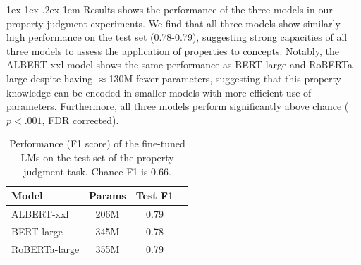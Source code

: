 \documentclass[10pt,letterpaper]{article}
\makeatletter
\newcommand{\km}[1]{\textcolor{purple}{$_{KM}$[#1]}}
\newcommand{\todo}[1]{\textcolor{purple}{$_{todo}$[#1]}}
\newcommand{\true}{\mathsf{True}}
\newcommand{\false}{\mathsf{False}}
\renewcommand{\paragraph}{%
  \@startsection{paragraph}{4}%
  {\z@}{1ex \@plus 1ex \@minus .2ex}{-1em}%
  {\normalfont\normalsize\bfseries}%
}
\makeatother
\begin{document}
\paragraph{Results}
 shows the performance of the three models in our property judgment experiments. 
We find that all three models show similarly high performance on the test set (0.78-0.79), suggesting strong capacities of all three models to assess the application of properties to concepts. Notably, the ALBERT-xxl model shows the same performance as BERT-large and RoBERTa-large despite having $\approx$130M fewer parameters, suggesting that this property knowledge can be encoded in smaller models with more efficient use of parameters.
Furthermore, all three models perform significantly above chance ($p < .001$, FDR corrected).

\begin{table}[t!]
\vspace{-1em}
\def\arraystretch{1.15}
\centering
\caption{Performance (F1 score) of the fine-tuned LMs on the test set of the property judgment task. Chance F1 is 0.66.}
\label{tab:f1}
\vspace{0.5em}
\begin{tabular}{|l|c|c|c|}
\hline
\textbf{Model} & \textbf{Params} & \textbf{Test F1} \\ \hline
ALBERT-xxl     & 206M            & 0.79    \\
BERT-large     & 345M            & 0.78    \\
RoBERTa-large  & 355M            & 0.79    \\ \hline
\end{tabular}
\vspace{-1em}
\end{table}
\end{document}
